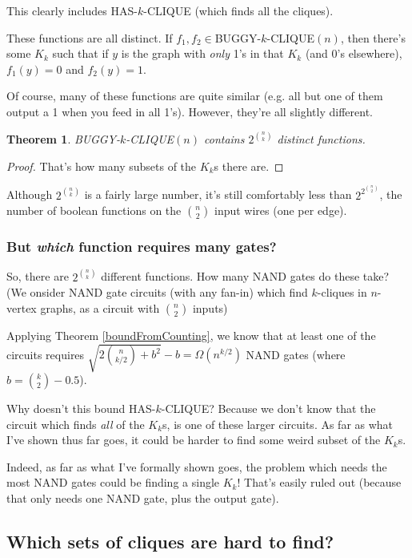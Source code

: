 \documentclass[12pt]{article}
\newtheorem{thm}{Theorem}[section]
\theoremstyle{definition}
\begin{document}
This clearly includes HAS-$k$-CLIQUE (which finds all the cliques).

These functions are all distinct. If $f_1,f_2\in $BUGGY-$k$-CLIQUE$(n)$,
then there's some $K_k$ such that if $y$ is the graph with {\em only}
1's in that $K_k$ (and 0's elsewhere), $f_1(y) = 0$ and $f_2(y) = 1$.

Of course, many of these functions are quite similar (e.g. all but one of them
output a 1 when you feed in all 1's). However, they're all slightly different.

\begin{thm}
\label{buggyDistinct}
BUGGY-$k$-CLIQUE$(n)$ contains $2^{n \choose k}$ distinct functions.
\end{thm}
\begin{proof}
That's how many subsets of the $K_k$s there are.
\end{proof}

Although $2^{n \choose k}$ is a fairly large number,
it's still comfortably less than $2^{2^{n \choose 2}}$, the number of boolean
functions on the ${n \choose 2}$ input wires (one per edge).

\subsubsection{But {\em which} function requires many gates?}

So, there are $2^{n \choose k}$ different functions. 
How many NAND gates do these take?
(We onsider NAND gate circuits (with any fan-in) which find $k$-cliques in $n$-vertex
graphs, as a circuit with $n \choose 2$ inputs)

Applying Theorem
\ref{boundFromCounting}, we know that at least one of the circuits requires
${\sqrt {2 {n \choose {k/2}} + b^2}} - b = \Omega(n^{k/2})$ 
NAND gates (where $b = {k \choose 2} - 0.5$).

Why doesn't this bound HAS-$k$-CLIQUE?
Because we don't know that the circuit which finds {\em all} of the
$K_k$s, is one of these larger circuits. As far as what I've
shown thus far goes, it could be harder to find some weird subset of the $K_k$s.

Indeed, as far as what I've formally shown goes, the problem which needs
the most NAND gates could be finding a single $K_k$! That's easily ruled out
(because that only needs one NAND gate, plus the output gate).

\subsection{Which sets of cliques are hard to find?}
\end{document}
